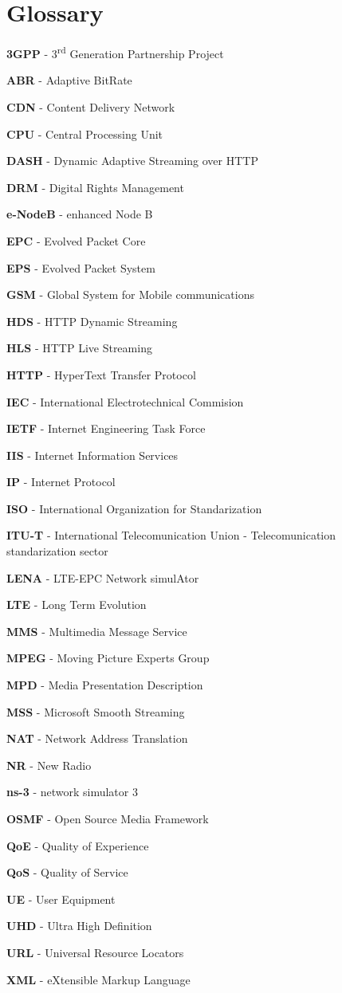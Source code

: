 \cleardoublepage
{}
\chapter*{Glossary}


\textbf{3GPP} - 3\textsuperscript{rd} Generation Partnership Project

\textbf{ABR} - Adaptive BitRate

\textbf{CDN} - Content Delivery Network

\textbf{CPU} - Central Processing Unit

\textbf{DASH} - Dynamic Adaptive Streaming over HTTP

\textbf{DRM} - Digital Rights Management

\textbf{e-NodeB} - enhanced Node B

\textbf{EPC} - Evolved Packet Core

\textbf{EPS} - Evolved Packet System

\textbf{GSM} - Global System for Mobile communications

\textbf{HDS} - HTTP Dynamic Streaming

\textbf{HLS} - HTTP Live Streaming\

\textbf{HTTP} - HyperText Transfer Protocol

\textbf{IEC} - International Electrotechnical Commision

\textbf{IETF} - Internet Engineering Task Force

\textbf{IIS} - Internet Information Services

\textbf{IP} - Internet Protocol

\textbf{ISO} - International Organization for Standarization

\textbf{ITU-T} - International Telecomunication Union - Telecomunication standarization sector

\textbf{LENA} - LTE-EPC Network simulAtor

\textbf{LTE} - Long Term Evolution

\textbf{MMS} - Multimedia Message Service

\textbf{MPEG} - Moving Picture Experts Group

\textbf{MPD} - Media Presentation Description

\textbf{MSS} - Microsoft Smooth Streaming

\textbf{NAT} - Network Address Translation

\textbf{NR} - New Radio

\textbf{ns-3} - network simulator 3

\textbf{OSMF} - Open Source Media Framework

\textbf{QoE} - Quality of Experience

\textbf{QoS} - Quality of Service

\textbf{UE} - User Equipment

\textbf{UHD} - Ultra High Definition

\textbf{URL} - Universal Resource Locators

\textbf{XML} - eXtensible Markup Language


\cleardoublepage
